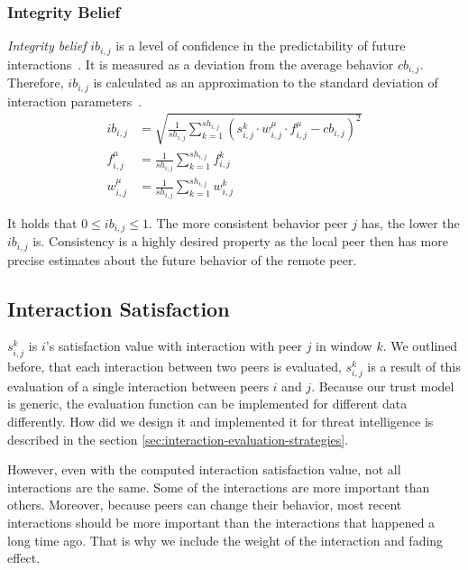 \subsubsection{Integrity Belief}
\textit{Integrity belief} $ib_{i,j}$ is a level of confidence in the predictability of future interactions~\cite{sort}. It is measured as a deviation from the average behavior $cb_{i,j}$.
Therefore, $ib_{i,j}$ is calculated as an approximation to the standard deviation of interaction parameters~\cite{sort}.
\begin{equation}
\begin{split}
    ib_{i,j} &= \sqrt{\frac{1}{sh_{i,j}} \sum_{k=1}^{sh_{i,j}}\left(s_{i,j}^{k} \cdot w_{i,j}^{\mu} \cdot f_{i,j}^{\mu} - cb_{i,j}\right)^{2}} \\
    f_{i,j}^{\mu} &= \frac{1}{sh_{i, j}} \sum_{k=1}^{sh_{i,j}} f^{k}_{i,j} \\
    w_{i,j}^{\mu} &= \frac{1}{sh_{i, j}} \sum_{k=1}^{sh_{i,j}} w^{k}_{i,j}
\end{split}
\end{equation}

It holds that $0 \leq ib_{i,j} \leq 1$.
The more consistent behavior peer $j$ has, the lower the $ib_{i,j}$ is. Consistency is a highly desired property as the local peer then has more precise estimates about the future behavior of the remote peer.

\subsection{Interaction Satisfaction}
\label{subsec:interaction-satisfaction}
$s^{k}_{i, j}$ is $i$'s satisfaction value with interaction with peer $j$ in window $k$.
We outlined before, that each interaction between two peers is evaluated, $s^{k}_{i, j}$ is a result of this evaluation of a single interaction between peers $i$ and $j$.
Because our trust model is generic, the evaluation function can be implemented for different data differently.
How did we design it and implemented it for threat intelligence is described in the section \ref{sec:interaction-evaluation-strategies}.

However, even with the computed interaction satisfaction value, not all interactions are the same. 
Some of the interactions are more important than others. 
Moreover, because peers can change their behavior, most recent interactions should be more important than the interactions that happened a long time ago.
That is why we include the weight of the interaction and fading effect.

